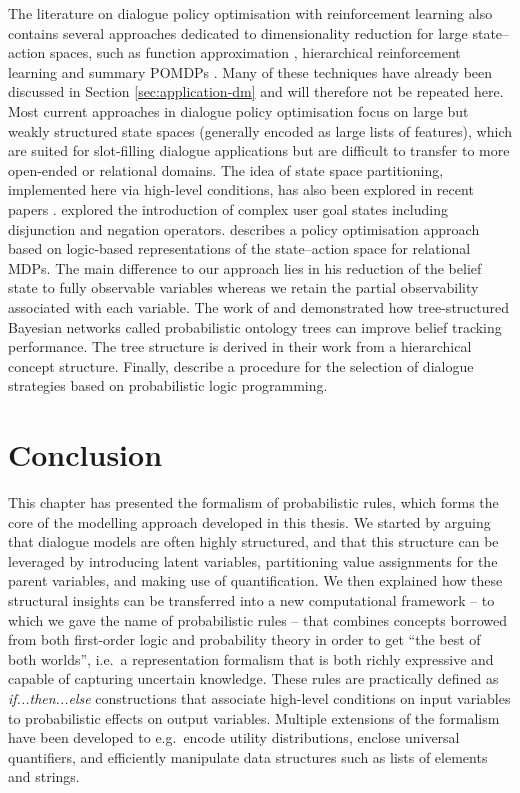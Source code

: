 The literature on dialogue policy optimisation with reinforcement learning also contains several approaches dedicated to dimensionality reduction for large state--action spaces, such as function approximation \citep{Henderson:2008}, hierarchical reinforcement learning \citep{Cuayahuitl:2010} and summary POMDPs \citep{Young:2010}.  Many of these techniques have already been discussed in Section \ref{sec:application-dm} and will therefore not be repeated here. Most current approaches in dialogue policy optimisation focus on large but weakly structured state spaces (generally encoded as large lists of features), which are suited for slot-filling dialogue applications but are difficult to transfer to more open-ended or relational domains.  The idea of state space partitioning, implemented here via high-level conditions, has also been explored in recent papers \citep[see e.g.\ ][]{Williams2010}. \cite{Crook:2010} explored the introduction of complex user goal states including disjunction and negation operators. \cite{Heriberto2011} describes a policy optimisation approach based on logic-based representations of the state--action space for relational MDPs. The main difference to our approach lies in his reduction of the belief state to fully observable variables whereas we retain the partial observability associated with each variable.  The work of \cite{Mehta:2010} and \cite{Raux2011} demonstrated how tree-structured Bayesian networks called probabilistic ontology trees can improve belief tracking performance.  The tree structure is derived in their work from a hierarchical concept structure.  Finally, \cite{neill2011} describe a procedure for the selection of dialogue strategies based on probabilistic logic programming. 

\section{Conclusion}

This chapter has presented the formalism of probabilistic rules, which forms the core of the modelling approach developed in this thesis. We started by arguing that dialogue models are often highly structured, and that this structure can be leveraged by introducing latent variables, partitioning value assignments for the parent variables, and making use of quantification. We then explained how these structural insights can be transferred into a new computational framework -- to which we gave the name of probabilistic rules -- that combines concepts borrowed from both first-order logic and probability theory in order to get ``the best of both worlds'', i.e.\ a representation formalism that is both richly expressive and capable of capturing uncertain knowledge.  These rules are practically defined as \textit{if...then...else} constructions that associate high-level conditions on input variables to probabilistic effects on output variables.  Multiple extensions of the formalism have been developed to e.g.\ encode utility distributions, enclose universal quantifiers, and efficiently manipulate data structures such as lists of elements and strings.

